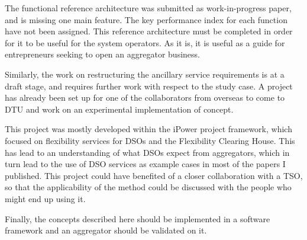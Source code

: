 The functional reference architecture was submitted as work-in-progress paper, and is missing one main feature. The key performance index for each function have not been assigned. This reference architecture must be completed in order for it to be useful for the system operators. As it is, it is useful as a guide for entrepreneurs seeking to open an aggregator business.

Similarly, the work on restructuring the ancillary service requirements is at a draft stage, and requires further work with respect to the study case. A project has already been set up for one of the collaborators from overseas to come to DTU and work on an experimental implementation of concept. 

This project was mostly developed within the iPower project framework, which focused on flexibility services for DSOs and the Flexibility Clearing House. This has lead to an understanding of what DSOs expect from aggregators, which in turn lead to the use of DSO services as example cases in most of the papers I published. This project could have benefited of a closer collaboration with a TSO, so that the applicability of the method could be discussed with the people who might end up using it.

Finally, the concepts described here should be implemented in a software framework and an aggregator should be validated on it.
%
%
